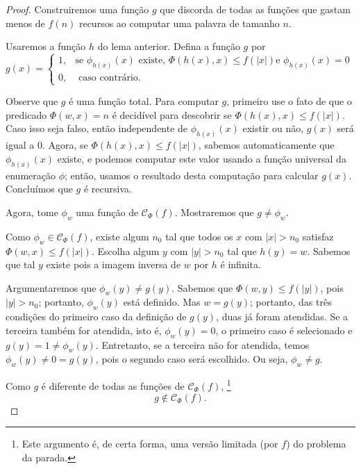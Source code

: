 \begin{proof}
    Construiremos uma função $g$
    que discorda de todas as funções
    que gastam menos de $f(n)$ recursos ao computar uma palavra de tamanho $n$.

    Usaremos a função $h$ do lema anterior.
    Defina a função $g$ por
    \begin{equation*}
        g(x) = \begin{cases}
            1, & \text{
                    se $\phi_{h(x)}(x)$ existe,
                    $\Phi(h(x), x) \leq f(|x|)$
                    e $\phi_{h(x)}(x) = 0$
                } \\
            0, & \text{ caso contrário.}
        \end{cases}
    \end{equation*}

    Observe que $g$ é uma função total.
    Para computar $g$,
    primeiro use o fato de que o predicado $\Phi(w, x) = n$ é decidível
    para descobrir se $\Phi(h(x), x) \leq f(|x|)$.
    Caso isso seja falso,
    então independente de $\phi_{h(x)}(x)$ existir ou não,
    $g(x)$ será igual a $0$.
    Agora, se $\Phi(h(x), x) \leq f(|x|)$,
    sabemos automaticamente que $\phi_{h(x)}(x)$ existe,
    e podemos computar este valor usando a função universal da enumeração $\phi$;
    então, usamos o resultado desta computação para calcular $g(x)$.
    Concluímos que $g$ é recursiva.

    Agora,
    tome $\phi_w$ uma função de $\mathcal C_\Phi(f)$.
    Mostraremos que $g \neq \phi_w$.

    Como $\phi_w \in \mathcal C_\Phi(f)$,
    existe algum $n_0$ tal que todos os $x$ com $|x| > n_0$ satisfaz
    $\Phi(w, x) \leq f(|x|)$.
    Escolha algum $y$ com $|y| > n_0$ tal que $h(y) = w$.
    Sabemos que tal $y$ existe pois a imagem inversa de $w$ por $h$ é infinita.

    Argumentaremos que $\phi_w(y) \neq g(y)$.
    Sabemos que $\Phi(w, y) \leq f(|y|)$,
    pois $|y| > n_0$;
    portanto, $\phi_w(y)$ está definido.
    Mas $w = g(y)$;
    portanto, das três condições do primeiro caso da definição de $g(y)$,
    duas já foram atendidas.
    Se a terceira também for atendida,
    isto é, $\phi_w(y) = 0$,
    o primeiro caso é selecionado e $g(y) = 1 \neq \phi_w(y)$.
    Entretanto,
    se a terceira não for atendida,
    temos $\phi_w(y) \neq 0 = g(y)$,
    pois o segundo caso será escolhido.
    Ou seja, $\phi_w \neq g$.

    Como $g$ é diferente de todas as funções de $\mathcal C_\Phi(f)$,%
    \footnote{
        Este argumento é,
        de certa forma,
        uma versão limitada
        (por $f$)
        do problema da parada.
    }
    \begin{equation*}
        g \notin \mathcal C_\Phi(f).
    \end{equation*}
\end{proof}
